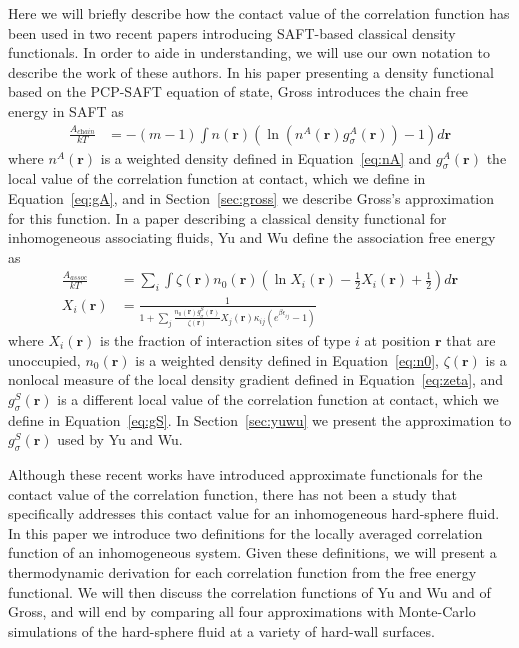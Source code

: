 \documentclass[letterpaper,amsmath,amssymb,10pt,pre]{revtex4-1}
\newcommand{\rr}{\textbf{r}}
\begin{document}
Here we will briefly describe how the contact value of the correlation
function has been used in two recent papers introducing SAFT-based
classical density functionals.  In order to aide in understanding, we
will use our own notation to describe the work of these authors.  In
his paper presenting a density functional based on the PCP-SAFT
equation of state\cite{gross2009density}, Gross introduces the chain
free energy in SAFT as
\begin{align}
  \frac{A_\textit{chain}}{kT} &= -(m-1) \int n(\rr) \left(\ln\left(n^A(\rr)
  g_\sigma^A(\rr) \right)-1\right) d\rr \label{eq:Achain}
\end{align}
where $n^A(\rr)$ is a weighted density defined in Equation~\ref{eq:nA}
and $g_\sigma^A(\rr)$ the local value of the correlation function at
contact, which we define in Equation~\ref{eq:gA}, and in
Section~\ref{sec:gross} we describe Gross's approximation for this
function. In a paper describing a classical
density functional for inhomogeneous associating
fluids\cite{yu2002fmt-dft-inhomogeneous-associating}, Yu and Wu define
the association free energy as
\begin{align}
  \frac{A_\textit{assoc}}{kT} &= \sum_i \int \zeta(\rr)n_0(\rr) \left(\ln X_i(\rr) - \frac12
  X_i(\rr) + \frac12\right) d\rr \label{eq:Aassoc} \\
  X_i(\rr) &= \frac{1}{1 + \sum_j \frac{n_0(\rr) g_\sigma^{S}(\rr)}{\zeta(\rr)}
                                 X_j(\rr)\kappa_{ij} \left(e^{\beta
                                   \epsilon_{ij}}-1\right)}
  \label{eq:X}
\end{align}
where $X_i(\rr)$ is the fraction of interaction sites of type $i$ at
position $\rr$ that are unoccupied, $n_0(\rr)$ is a weighted density
defined in Equation~\ref{eq:n0}, $\zeta(\rr)$ is a nonlocal measure of
the local density gradient defined in Equation~\ref{eq:zeta}, and
$g_\sigma^S(\rr)$ is a different local value of the correlation
function at contact, which we define in Equation~\ref{eq:gS}.  In
Section~\ref{sec:yuwu} we present the approximation to
$g_\sigma^S(\rr)$ used by Yu and Wu.

Although these recent works have introduced approximate functionals
for the contact value of the correlation
function\cite{yu2002fmt-dft-inhomogeneous-associating,
  gross2009density}, there has not been a study that specifically
addresses this contact value for an inhomogeneous hard-sphere fluid.
%
In this paper we introduce two definitions for the locally averaged
correlation function of an inhomogeneous system.
%
%
Given these definitions, we will present a thermodynamic derivation
for each correlation function from the free energy functional.  We
will then discuss the correlation functions of Yu and Wu and of Gross, and
will end by comparing all four approximations with Monte-Carlo
simulations of the hard-sphere fluid at a variety of hard-wall
surfaces.
\end{document}
